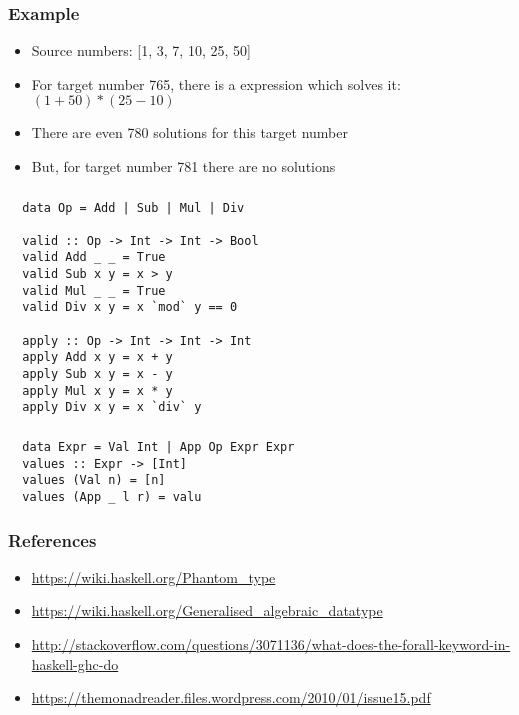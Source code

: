 \documentclass[aspectratio=43]{beamer}
\begin{document}
\begin{frame}
 \frametitle{Example}
 \begin{itemize}
  \item Source numbers: [1, 3, 7, 10, 25, 50]
  \item For target number 765, there is a expression which solves it: $(1 + 50)*(25 - 10)$
  \item There are even 780 solutions for this target number
  \item But, for target number 781 there are no solutions
 \end{itemize}
\end{frame}

\begin{frame}[fragile]
 \frametitle{}
 \begin{lstlisting}
  data Op = Add | Sub | Mul | Div
  
  valid :: Op -> Int -> Int -> Bool 
  valid Add _ _ = True
  valid Sub x y = x > y
  valid Mul _ _ = True
  valid Div x y = x `mod` y == 0
  
  apply :: Op -> Int -> Int -> Int
  apply Add x y = x + y
  apply Sub x y = x - y
  apply Mul x y = x * y
  apply Div x y = x `div` y
  \end{lstlisting}
\end{frame}

\begin{frame}[fragile]
 \frametitle{}
 \begin{lstlisting}
  data Expr = Val Int | App Op Expr Expr
  values :: Expr -> [Int]
  values (Val n) = [n]
  values (App _ l r) = valu
 \end{lstlisting}
\end{frame}













\begin{frame}[fragile]
 \frametitle{References}
 \begin{itemize}
  \item \url{https://wiki.haskell.org/Phantom_type}
  \item \url{https://wiki.haskell.org/Generalised_algebraic_datatype}
  \item \url{http://stackoverflow.com/questions/3071136/what-does-the-forall-keyword-in-haskell-ghc-do}
  \item \url{https://themonadreader.files.wordpress.com/2010/01/issue15.pdf}
 \end{itemize}
\end{frame}
\end{document}
